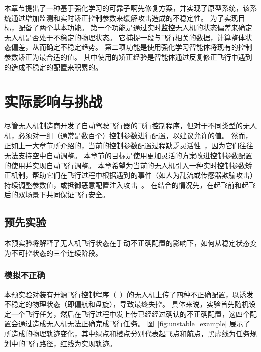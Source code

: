 本章节提出了一种基于强化学习的可靠子啊先修复方案，并实现了原型系统\nyctea，该系统通过增加监测和实时矫正控制参数来缓解攻击造成的不稳定性。
为了实现目标，\nyctea 配备了两个基本功能。
第一个功能是通过实时监控无人机的状态偏差来确定无人机是否处于不稳定的物理状态。
它捕捉一段与飞行相关的数据，计算整体状态偏差，从而确定不稳定趋势。
第二项功能是使用强化学习智能体将现有的控制参数矫正为最合适的值。
其中使用的矫正经验是智能体通过反复修正飞行中遇到的造成不稳定的配置来积累的。



\section{实际影响与挑战}
尽管无人机制造商开发了自动驾驶飞行器的飞行控制程序，但对于不同类型的无人机，必须对一组（通常是数百个）控制参数进行配置，以建议允许的值。
然而，正如上一大章节所介绍的，当前的控制参数配置过程缺乏灵活性~\cite{avola2021automatic}，因为它们往往无法支持空中自动调整。
本章节的目标是使用更加灵活的方案改进控制参数配置的使用并实现自动飞行调整。
本章希望为当前的无人机引入一种实时控制参数矫正机制，帮助它们在飞行过程中根据遇到的事件（如人为乱流或传感器欺骗攻击）持续调整参数值，或抵御恶意配置注入攻击~\cite{rvfuzzer, han2022control}。
在结合\icsearcher 的情况先，在起飞前和起飞后的双场景下共同保证飞行安全。


\subsection{预先实验}
本预实验将解释了无人机飞行状态在手动不正确配置的影响下，如何从稳定状态变为不可控状态的三个连续阶段。

\subsubsection{模拟不正确}
本预实验对装有开源飞行控制程序（~\cite{ardupilot}）的无人机上传了四种不正确配置，以诱发不稳定的物理状态（即偏航和盘旋），导致最终失控。
具体来说，实验首先随机设定一个飞行任务，然后在飞行过程中发上传已经经过确认的不正确配置，这四个配置会通过造成无人机无法正确完成飞行任务。
图~\ref{fig:unstable_example} 展示了所造成的物理轨迹变化，其中绿点和橙点分别代表起飞点和航点，黑虚线为任务规划中的飞行路径，红线为实现轨迹。

